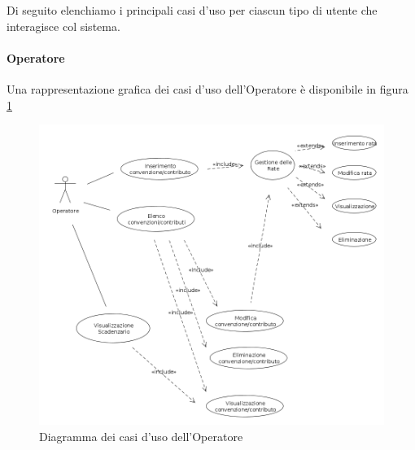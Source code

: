 Di seguito elenchiamo i principali casi d'uso per ciascun tipo di utente che interagisce col sistema. 

\paragraph{Operatore}
Una rappresentazione grafica dei casi d'uso dell'Operatore è disponibile in figura \ref{use_case_diag_operator}
\begin{figure}[h]
  \caption{Diagramma dei casi d'uso dell'Operatore}
  \label{use_case_diag_operator}
  \centering
    \includegraphics[width=1\textwidth]{images/casi_uso_operatore.png}
\end{figure}


